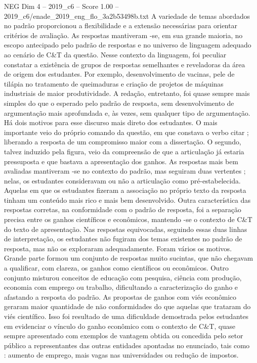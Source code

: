 \begin{textsample}{NEG Dim 4 – 2019\_c6 – Score 1.00 – 2019\_c6/enade\_2019\_eng\_flo\_3a2b53498b.txt}
A variedade de temas abordados no padrão proporcionou a flexibilidade e a extensão necessárias para orientar critérios de avaliação.
As respostas mantiveram -se, em sua grande maioria, no escopo antecipado pelo padrão de respostas e no universo de linguagem adequado ao cenário de C\&T da questão.
Nesse contexto da linguagem, foi peculiar constatar a existência de grupos de respostas semelhantes e reveladoras da área de origem dos estudantes.
Por exemplo, desenvolvimento de vacinas, pele de tilápia no tratamento de queimaduras e criação de projetos de máquinas industriais de maior produtividade.
A redação, entretanto, foi quase sempre mais simples do que o esperado pelo padrão de resposta, sem desenvolvimento de argumentação mais aprofundada e, às vezes, sem qualquer tipo de argumentação.
Há dois motivos para esse discurso mais direto dos estudantes.
O mais importante veio do próprio comando da questão, em que constava o verbo citar ; liberando a resposta de um compromisso maior com a dissertação.
O segundo, talvez induzido pela figura, veio da compreensão de que a articulação já estaria pressuposta e que bastava a apresentação dos ganhos.
As respostas mais bem avaliadas mantiveram -se no contexto do padrão, mas seguiram duas vertentes ; nelas, os estudantes consideravam ou não a articulação como pré-estabelecida.
Aquelas em que os estudantes fizeram a associação no próprio texto da resposta tinham um conteúdo mais rico e mais bem desenvolvido.
Outra característica das respostas corretas, na conformidade com o padrão de resposta, foi a separação precisa entre os ganhos científicos e econômicos, mantendo -se o contexto de C\&T do texto de apresentação.
Nas respostas equivocadas, seguindo essas duas linhas de interpretação, os estudantes não fugiram dos temas existentes no padrão de resposta, mas não os exploraram adequadamente.
Foram vários os motivos.
Grande parte formou um conjunto de respostas muito sucintas, que não chegavam a qualificar, com clareza, os ganhos como científicos ou econômicos.
Outro conjunto misturou conceitos de educação com pesquisa, ciência com produção, economia com emprego ou trabalho, dificultando a caracterização do ganho e afastando a resposta do padrão.
As propostas de ganhos com viés econômico geraram maior quantidade de não conformidades do que aquelas que trataram do viés científico.
Isso foi resultado de uma dificuldade demostrada pelos estudantes em evidenciar o vínculo do ganho econômico com o contexto de C\&T, quase sempre apresentado com exemplos de vantagem obtida ou concedida pelo setor público a representantes das outras entidades apontadas no enunciado, tais como : aumento de emprego, mais vagas nas universidades ou redução de impostos.

\end{textsample}

